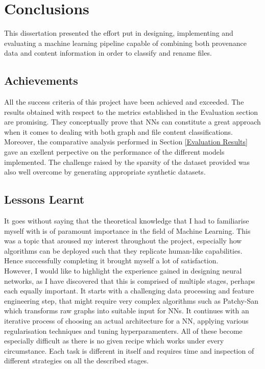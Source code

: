
    
    \chapter{Conclusions}
    This dissertation presented the effort put in designing, implementing and evaluating a machine learning pipeline capable of combining both provenance data and content information in order to classify and rename files.
    
    \section{Achievements}
    All the success criteria of this project have been achieved and exceeded. The results obtained with respect to the metrics established in the Evaluation section are promising. They conceptually prove that NNs can constitute a great approach when it comes to dealing with both graph and file content classifications.  Moreover, the comparative analysis performed in Section \ref{Evaluation Results} gave an exellent perpective on the performance of the different models implemented. The challenge raised by the sparsity of the dataset provided was also well overcome by generating appropriate synthetic datasets.
    
    
    \section{Lessons Learnt}
    It goes without saying that the theoretical knowledge that I had to familiarise myself with is of paramount importance in the field of Machine Learning. This was a topic that aroused my interest throughout the project, especially how algorithms can be deployed such that they replicate human-like capabilities. Hence successfully completing it brought myself a lot of satisfaction. \\
    
    However, I would like to highlight the experience gained in designing neural networks, as I have discovered that this is comprised of multiple stages, perhaps each equally important. It starts with a challenging data processing and feature engineering step, that might require very complex algorithms such as Patchy-San which transforms raw graphs into suitable input for NNs. It continues with an iterative process of choosing an actual architecture for a NN, applying various regularisation techniques and tuning hyperparamenters. All of these become especially difficult as there is no given recipe which works under every circumstance. Each task is different in itself and requires time and inspection of different strategies on all the described stages. \\
    
